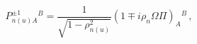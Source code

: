 \begin{equation}
P^{\pm 1}_{n(u)A}{}^B=\frac{1}{\sqrt{1-\rho_{n(u)}^2}}(1\mp i\rho_n\Omega\Pi)_A{}^B\,,
\end{equation}

